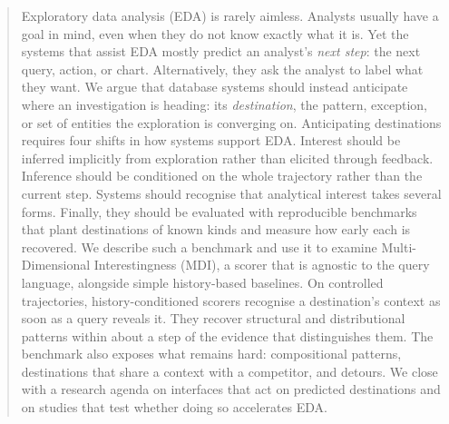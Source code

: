 \documentclass[sigconf]{acmart}
\begin{document}
\begin{abstract}
Exploratory data analysis (EDA) is rarely aimless. Analysts usually have a goal in mind, even when they do not know exactly what it is. Yet the systems that assist EDA mostly predict an analyst's \emph{next step}: the next query, action, or chart. Alternatively, they ask the analyst to label what they want. We argue that database systems should instead anticipate where an investigation is heading: its \emph{destination}, the pattern, exception, or set of entities the exploration is converging on. Anticipating destinations requires four shifts in how systems support EDA. Interest should be inferred implicitly from exploration rather than elicited through feedback. Inference should be conditioned on the whole trajectory rather than the current step. Systems should recognise that analytical interest takes several forms. Finally, they should be evaluated with reproducible benchmarks that plant destinations of known kinds and measure how early each is recovered. We describe such a benchmark and use it to examine Multi-Dimensional Interestingness (MDI), a scorer that is agnostic to the query language, alongside simple history-based baselines. On controlled trajectories, history-conditioned scorers recognise a destination's context as soon as a query reveals it. They recover structural and distributional patterns within about a step of the evidence that distinguishes them. The benchmark also exposes what remains hard: compositional patterns, destinations that share a context with a competitor, and detours. We close with a research agenda on interfaces that act on predicted destinations and on studies that test whether doing so accelerates EDA.



\end{abstract}
\end{document}
